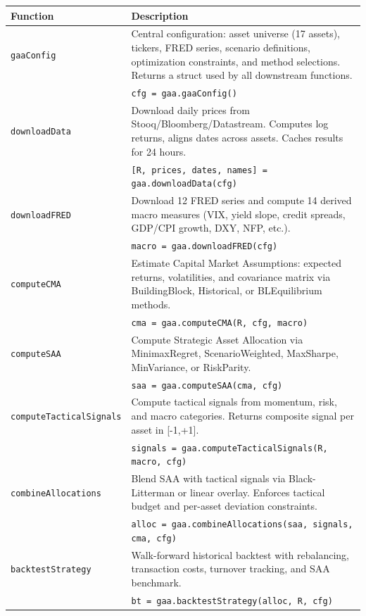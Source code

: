 \documentclass[11pt,a4paper]{article}
\begin{document}
\begin{longtable}{p{3.8cm} p{11.2cm}}
\toprule
\textbf{Function} & \textbf{Description} \\
\midrule
\endhead
\texttt{gaaConfig} & Central configuration: asset universe (17 assets), tickers, FRED series, scenario definitions, optimization constraints, and method selections. Returns a struct used by all downstream functions. \\
& {\small\texttt{cfg = gaa.gaaConfig()}} \\
\midrule
\texttt{downloadData} & Download daily prices from Stooq/Bloomberg/Datastream. Computes log returns, aligns dates across assets. Caches results for 24 hours. \\
& {\small\texttt{[R, prices, dates, names] = gaa.downloadData(cfg)}} \\
\midrule
\texttt{downloadFRED} & Download 12 FRED series and compute 14 derived macro measures (VIX, yield slope, credit spreads, GDP/CPI growth, DXY, NFP, etc.). \\
& {\small\texttt{macro = gaa.downloadFRED(cfg)}} \\
\midrule
\texttt{computeCMA} & Estimate Capital Market Assumptions: expected returns, volatilities, and covariance matrix via BuildingBlock, Historical, or BLEquilibrium methods. \\
& {\small\texttt{cma = gaa.computeCMA(R, cfg, macro)}} \\
\midrule
\texttt{computeSAA} & Compute Strategic Asset Allocation via MinimaxRegret, ScenarioWeighted, MaxSharpe, MinVariance, or RiskParity. \\
& {\small\texttt{saa = gaa.computeSAA(cma, cfg)}} \\
\midrule
\texttt{computeTacticalSignals} & Compute tactical signals from momentum, risk, and macro categories. Returns composite signal per asset in [-1,+1]. \\
& {\small\texttt{signals = gaa.computeTacticalSignals(R, macro, cfg)}} \\
\midrule
\texttt{combineAllocations} & Blend SAA with tactical signals via Black-Litterman or linear overlay. Enforces tactical budget and per-asset deviation constraints. \\
& {\small\texttt{alloc = gaa.combineAllocations(saa, signals, cma, cfg)}} \\
\midrule
\texttt{backtestStrategy} & Walk-forward historical backtest with rebalancing, transaction costs, turnover tracking, and SAA benchmark. \\
& {\small\texttt{bt = gaa.backtestStrategy(alloc, R, cfg)}} \\

\end{longtable}
\end{document}
